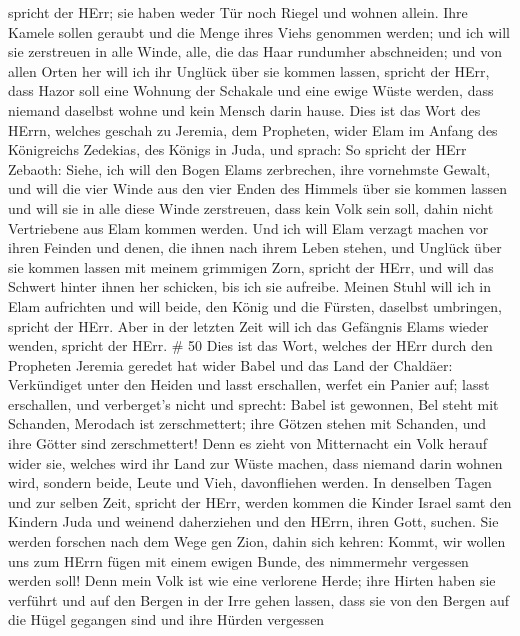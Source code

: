 spricht der HErr; sie haben weder Tür noch Riegel und wohnen allein.
 Ihre Kamele sollen geraubt und die Menge ihres Viehs
genommen werden; und ich will sie zerstreuen in alle Winde, alle, die
das Haar rundumher abschneiden; und von allen Orten her will ich ihr
Unglück über sie kommen lassen, spricht der HErr,  dass
Hazor soll eine Wohnung der Schakale und eine ewige Wüste werden, dass
niemand daselbst wohne und kein Mensch darin hause.  Dies
ist das Wort des HErrn, welches geschah zu Jeremia, dem Propheten, wider
Elam im Anfang des Königreichs Zedekias, des Königs in Juda, und sprach:
 So spricht der HErr Zebaoth: Siehe, ich will den Bogen
Elams zerbrechen, ihre vornehmste Gewalt,  und will die
vier Winde aus den vier Enden des Himmels über sie kommen lassen und
will sie in alle diese Winde zerstreuen, dass kein Volk sein soll, dahin
nicht Vertriebene aus Elam kommen werden.  Und ich will
Elam verzagt machen vor ihren Feinden und denen, die ihnen nach ihrem
Leben stehen, und Unglück über sie kommen lassen mit meinem grimmigen
Zorn, spricht der HErr, und will das Schwert hinter ihnen her schicken,
bis ich sie aufreibe.  Meinen Stuhl will ich in Elam
aufrichten und will beide, den König und die Fürsten, daselbst
umbringen, spricht der HErr.  Aber in der letzten Zeit will
ich das Gefängnis Elams wieder wenden, spricht der HErr. \# 50
 Dies ist das Wort, welches der HErr durch den Propheten
Jeremia geredet hat wider Babel und das Land der Chaldäer: 
Verkündiget unter den Heiden und lasst erschallen, werfet ein Panier
auf; lasst erschallen, und verberget's nicht und sprecht: Babel ist
gewonnen, Bel steht mit Schanden, Merodach ist zerschmettert; ihre
Götzen stehen mit Schanden, und ihre Götter sind zerschmettert!
 Denn es zieht von Mitternacht ein Volk herauf wider sie,
welches wird ihr Land zur Wüste machen, dass niemand darin wohnen wird,
sondern beide, Leute und Vieh, davonfliehen werden.  In
denselben Tagen und zur selben Zeit, spricht der HErr, werden kommen die
Kinder Israel samt den Kindern Juda und weinend daherziehen und den
HErrn, ihren Gott, suchen.  Sie werden forschen nach dem
Wege gen Zion, dahin sich kehren: Kommt, wir wollen uns zum HErrn fügen
mit einem ewigen Bunde, des nimmermehr vergessen werden soll!
 Denn mein Volk ist wie eine verlorene Herde; ihre Hirten
haben sie verführt und auf den Bergen in der Irre gehen lassen, dass sie
von den Bergen auf die Hügel gegangen sind und ihre Hürden vergessen
